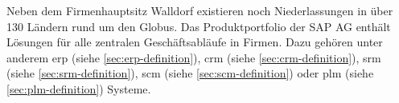 Neben dem Firmenhauptsitz Walldorf existieren noch Niederlassungen in über 130 Ländern \cite{SAPLocations} rund um den Globus.
Das Produktportfolio der SAP AG enthält Lösungen für alle zentralen Geschäftsabläufe in Firmen. Dazu gehören unter anderem \gls{erp} (siehe \ref{sec:erp-definition}), \gls{crm} (siehe \ref{sec:crm-definition}), \gls{srm} (siehe \ref{sec:srm-definition}), \gls{scm} (siehe \ref{sec:scm-definition}) oder \gls{plm} (siehe \ref{sec:plm-definition}) Systeme.

